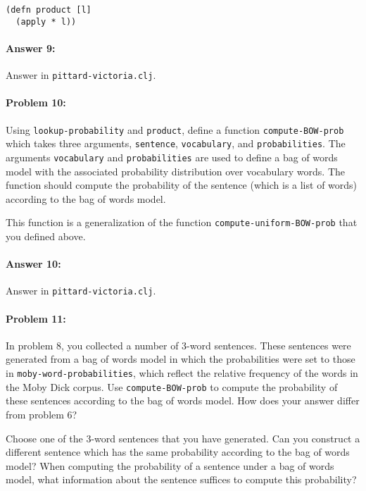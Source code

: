 \documentclass[10pt]{article}
\begin{document}
\begin{lstlisting}
(defn product [l]
  (apply * l))
\end{lstlisting}

\paragraph{Answer 9:} Answer in
\texttt{pittard-victoria.clj}.

\hrulefill
\paragraph{Problem 10:}

Using \texttt{lookup-probability} and \texttt{product}, define a
function \texttt{compute-BOW-prob} which takes three arguments,
\texttt{sentence}, \texttt{vocabulary}, and
\texttt{probabilities}. The arguments \texttt{vocabulary} and
\texttt{probabilities} are used to define a bag of words model with
the associated probability distribution over vocabulary words. The
function should compute the probability of the sentence (which is a
list of words) according to the bag of words model.

This function is a generalization of the function
\texttt{compute-uniform-BOW-prob} that you defined above.

\paragraph{Answer 10:} Answer in
\texttt{pittard-victoria.clj}.

\hrulefill
\paragraph{Problem 11:}

In problem 8, you collected a number of 3-word sentences. These
sentences were generated from a bag of words model in which the
probabilities were set to those in \texttt{moby-word-probabilities},
which reflect the relative frequency of the words in the Moby Dick
corpus. Use \texttt{compute-BOW-prob} to compute the probability of
these sentences according to the bag of words model. How does your
answer differ from problem 6?

Choose one of the 3-word sentences that you have generated. Can you
construct a different sentence which has the same probability
according to the bag of words model? When computing the probability of
a sentence under a bag of words model, what information about the
sentence suffices to compute this probability?
\end{document}
